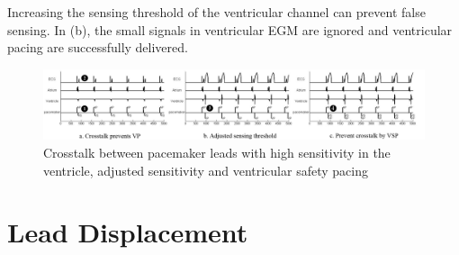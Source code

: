 Increasing the sensing threshold of the ventricular channel can prevent false sensing. In (b), the small signals in ventricular EGM are ignored and ventricular pacing are successfully delivered. 
\begin{figure}[!t]
\center
\vspace{-10pt}
		\includegraphics[width=\textwidth]{figs/crosstalk_all.pdf}
\vspace{-20pt}
\caption{Crosstalk between pacemaker leads with high sensitivity in the ventricle, adjusted sensitivity and ventricular safety pacing}
\label{fig:crosstalk}
\vspace{-15pt}
\end{figure}
\section{Lead Displacement}
